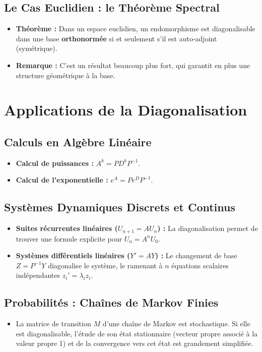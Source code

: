 \documentclass[12pt, a4paper, parskip=full]{report}
\theoremstyle{agregstyle}
\begin{document}
\subsection{Le Cas Euclidien : le Théorème Spectral}
\begin{itemize}
    \item \textbf{Théorème :} Dans un espace euclidien, un endomorphisme est diagonalisable dans une base \textbf{orthonormée} si et seulement s'il est auto-adjoint (symétrique).
    \item \textbf{Remarque :} C'est un résultat beaucoup plus fort, qui garantit en plus une structure géométrique à la base.
\end{itemize}

\section{Applications de la Diagonalisation}

\subsection{Calculs en Algèbre Linéaire}
\begin{itemize}
    \item \textbf{Calcul de puissances :} $A^k = PD^kP^{-1}$.
    \item \textbf{Calcul de l'exponentielle :} $e^A = Pe^DP^{-1}$.
\end{itemize}

\subsection{Systèmes Dynamiques Discrets et Continus}
\begin{itemize}
    \item \textbf{Suites récurrentes linéaires ($U_{n+1}=AU_n$) :} La diagonalisation permet de trouver une formule explicite pour $U_n = A^n U_0$.
    \item \textbf{Systèmes différentiels linéaires ($Y'=AY$) :} Le changement de base $Z=P^{-1}Y$ diagonalise le système, le ramenant à $n$ équations scalaires indépendantes $z_i' = \lambda_i z_i$.
\end{itemize}

\subsection{Probabilités : Chaînes de Markov Finies}
\begin{itemize}
    \item La matrice de transition $M$ d'une chaîne de Markov est stochastique. Si elle est diagonalisable, l'étude de son état stationnaire (vecteur propre associé à la valeur propre 1) et de la convergence vers cet état est grandement simplifiée.
\end{itemize}
\end{document}
